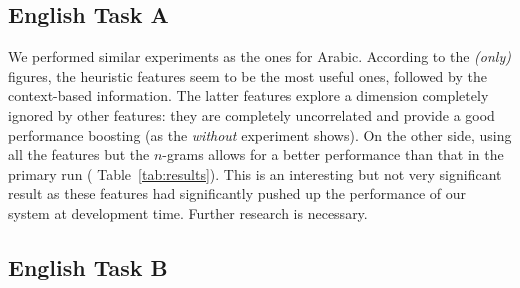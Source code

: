 
\subsection{English Task A} \label{sec:discussiona}

We performed similar experiments as the ones for Arabic. According to the 
\textit{(only)} figures, the heuristic features seem to be the most useful ones, 
followed by the context-based information. The latter features explore a 
dimension completely ignored by other features:  they are completely 
uncorrelated and provide a good performance boosting (as the \textit{without} 
experiment shows). On the other side, using all the features but the $n$-grams 
allows for a better performance than that in the primary run (\cf 
Table~\ref{tab:results}). This is an interesting but not very significant result 
as these features had significantly pushed up the performance of our system at 
development time. Further research is necessary.
  
\subsection{English Task B} \label{sec:discussionb}

